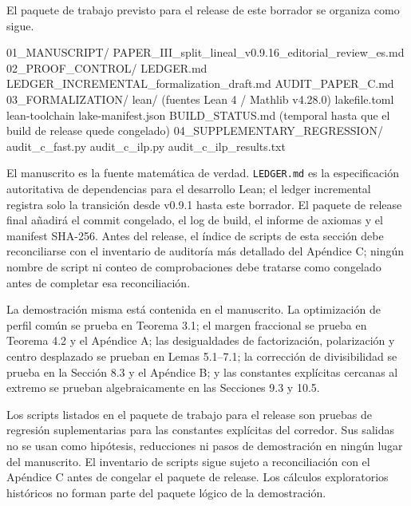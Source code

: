 \documentclass[
  11pt,
]{article}
\newenvironment{Shaded}{}{}
\newcommand{\NormalTok}[1]{#1}
\begin{document}
El paquete de trabajo previsto para el release de este borrador se
organiza como sigue.

\begin{Shaded}
\begin{Highlighting}[]
\NormalTok{01\_MANUSCRIPT/}
\NormalTok{    PAPER\_III\_split\_lineal\_v0.9.16\_editorial\_review\_es.md}
\NormalTok{02\_PROOF\_CONTROL/}
\NormalTok{    LEDGER.md}
\NormalTok{    LEDGER\_INCREMENTAL\_formalization\_draft.md}
\NormalTok{    AUDIT\_PAPER\_C.md}
\NormalTok{03\_FORMALIZATION/}
\NormalTok{    lean/                         (fuentes Lean 4 / Mathlib v4.28.0)}
\NormalTok{    lakefile.toml}
\NormalTok{    lean{-}toolchain}
\NormalTok{    lake{-}manifest.json}
\NormalTok{    BUILD\_STATUS.md               (temporal hasta que el build de release quede congelado)}
\NormalTok{04\_SUPPLEMENTARY\_REGRESSION/}
\NormalTok{    audit\_c\_fast.py}
\NormalTok{    audit\_c\_ilp.py}
\NormalTok{    audit\_c\_ilp\_results.txt}
\end{Highlighting}
\end{Shaded}

El manuscrito es la fuente matemática de verdad. \texttt{LEDGER.md} es
la especificación autoritativa de dependencias para el desarrollo Lean;
el ledger incremental registra solo la transición desde v0.9.1 hasta
este borrador. El paquete de release final añadirá el commit congelado,
el log de build, el informe de axiomas y el manifest SHA-256. Antes del
release, el índice de scripts de esta sección debe reconciliarse con el
inventario de auditoría más detallado del Apéndice C; ningún nombre de
script ni conteo de comprobaciones debe tratarse como congelado antes de
completar esa reconciliación.

La demostración misma está contenida en el manuscrito. La optimización
de perfil común se prueba en Teorema 3.1; el margen fraccional se prueba
en Teorema 4.2 y el Apéndice A; las desigualdades de factorización,
polarización y centro desplazado se prueban en Lemas 5.1--7.1; la
corrección de divisibilidad se prueba en la Sección 8.3 y el Apéndice B;
y las constantes explícitas cercanas al extremo se prueban
algebraicamente en las Secciones 9.3 y 10.5.

Los scripts listados en el paquete de trabajo para el release son
pruebas de regresión suplementarias para las constantes explícitas del
corredor. Sus salidas no se usan como hipótesis, reducciones ni pasos de
demostración en ningún lugar del manuscrito. El inventario de scripts
sigue sujeto a reconciliación con el Apéndice C antes de congelar el
paquete de release. Los cálculos exploratorios históricos no forman
parte del paquete lógico de la demostración.
\end{document}
